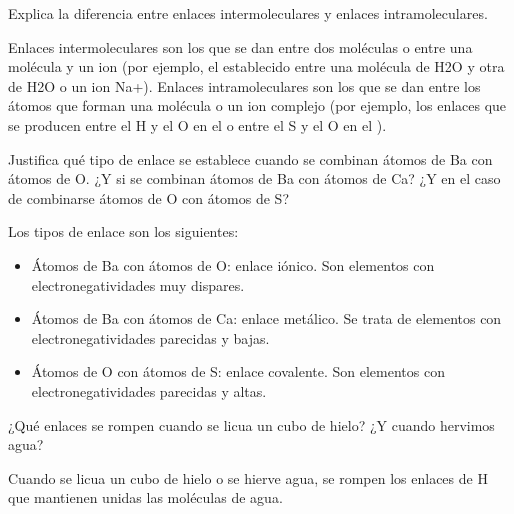 \begin{question}
    Explica la diferencia entre enlaces intermoleculares y enlaces
    intramoleculares.
    \begin{solu}

        Enlaces intermoleculares son los que se dan entre dos moléculas
        o entre una molécula y un ion (por ejemplo, el establecido
        entre una molécula de H2O y otra de H2O o un ion Na+).
        Enlaces intramoleculares son los que se dan entre los átomos
        que forman una molécula o un ion complejo (por ejemplo,
        los enlaces que se producen entre el H y el O en el  o
        entre el S y el O en el ).

    \end{solu}
\end{question}



\begin{question}
    Justifica qué tipo de enlace se establece cuando se combinan
    átomos de Ba con átomos de O. ¿Y si se combinan
    átomos de Ba con átomos de Ca? ¿Y en el caso de
    combinarse átomos de O con átomos de S?
    \begin{solu}

        Los tipos de enlace son los siguientes:

        \begin{itemize}
            \item Átomos de Ba con átomos de O: enlace iónico. Son elementos
            con electronegatividades muy dispares.
            \item Átomos de Ba con átomos de Ca: enlace metálico. Se
            trata de elementos con electronegatividades parecidas y
            bajas.
            \item Átomos de O con átomos de S: enlace covalente. Son elementos
            con electronegatividades parecidas y altas.
        \end{itemize}


    \end{solu}
\end{question}




\begin{question}
    ¿Qué enlaces se rompen cuando se licua un cubo de
    hielo? ¿Y cuando hervimos agua?
    \begin{solu}

        Cuando se licua un cubo de hielo o se hierve agua, se rompen
        los enlaces de H que mantienen unidas las moléculas de
        agua.

    \end{solu}
\end{question}




